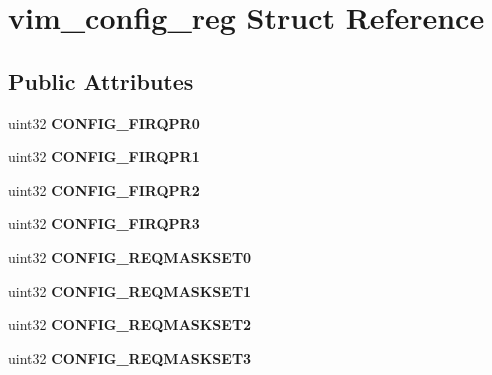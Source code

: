 \hypertarget{structvim__config__reg}{}\section{vim\+\_\+config\+\_\+reg Struct Reference}
\label{structvim__config__reg}
\subsection*{Public Attributes}
\begin{DoxyCompactItemize}
\item 
\mbox{\label{structvim__config__reg_a6251c86691d5ccbd3f875e76bbd52df1}} 
uint32 {\bfseries C\+O\+N\+F\+I\+G\+\_\+\+F\+I\+R\+Q\+P\+R0}
\item 
\mbox{\label{structvim__config__reg_a2fd6f28f0ca6c38e78f8f09f186e367e}} 
uint32 {\bfseries C\+O\+N\+F\+I\+G\+\_\+\+F\+I\+R\+Q\+P\+R1}
\item 
\mbox{\label{structvim__config__reg_a14157b1100f91eb9cbd6ea7a77762fe3}} 
uint32 {\bfseries C\+O\+N\+F\+I\+G\+\_\+\+F\+I\+R\+Q\+P\+R2}
\item 
\mbox{\label{structvim__config__reg_ad8a6b5f51e8d1fe730a9a1fc971db9f6}} 
uint32 {\bfseries C\+O\+N\+F\+I\+G\+\_\+\+F\+I\+R\+Q\+P\+R3}
\item 
\mbox{\label{structvim__config__reg_a4129d444c8f7783683ccace6d7680486}} 
uint32 {\bfseries C\+O\+N\+F\+I\+G\+\_\+\+R\+E\+Q\+M\+A\+S\+K\+S\+E\+T0}
\item 
\mbox{\label{structvim__config__reg_a2b2d22f8e0380cd5f86cb25923f26121}} 
uint32 {\bfseries C\+O\+N\+F\+I\+G\+\_\+\+R\+E\+Q\+M\+A\+S\+K\+S\+E\+T1}
\item 
\mbox{\label{structvim__config__reg_a5d2dc22384a05fdad06b52584c27574f}} 
uint32 {\bfseries C\+O\+N\+F\+I\+G\+\_\+\+R\+E\+Q\+M\+A\+S\+K\+S\+E\+T2}
\item 
\mbox{\label{structvim__config__reg_ac1f56e33afed8c5ca958b10a93526f3c}} 
uint32 {\bfseries C\+O\+N\+F\+I\+G\+\_\+\+R\+E\+Q\+M\+A\+S\+K\+S\+E\+T3}

\end{DoxyCompactItemize}
